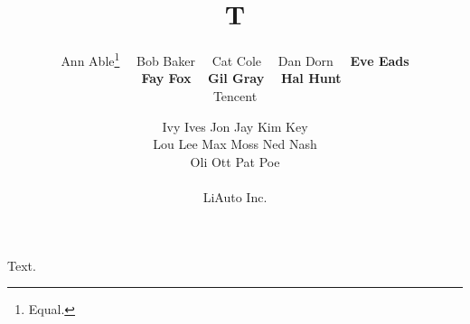 \documentclass{article}
\title{T}
\author{Ann Able\thanks{Equal.} ~~Bob Baker ~~Cat Cole ~~Dan Dorn ~~{\bf Eve Eads} \\
~~{\bf Fay Fox} ~~{\bf Gil Gray} ~~{\bf Hal Hunt} \\
Tencent
\and Ivy Ives\;\;\; Jon Jay\;\;\; Kim Key \\[0.2em]
Lou Lee\;\;\; Max Moss\;\;\; Ned Nash \\[0.2em]
Oli Ott\;\;\; Pat Poe \\
\vspace{2mm} \\
LiAuto Inc.}
\begin{document}
\maketitle
Text.
\end{document}
